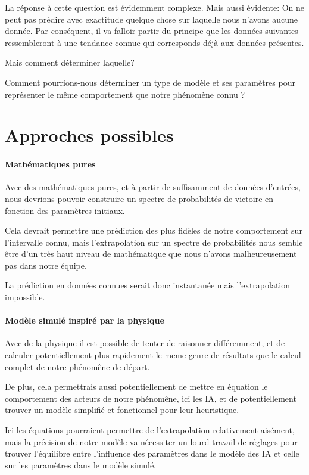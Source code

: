 		La réponse à cette question est évidemment complexe. Mais aussi évidente: On ne peut pas prédire avec exactitude quelque chose sur laquelle nous n'avons aucune donnée. 
		Par conséquent, il va falloir partir du principe que les données suivantes ressembleront à une tendance connue qui corresponds déjà aux données présentes.
		
		Mais comment déterminer laquelle?
	
		\begin{problem}
			Comment pourrions-nous déterminer un type de modèle et ses paramètres pour représenter le même comportement que notre phénomène connu ?
		\end{problem}
	
	\section{Approches possibles}
	
		\paragraph{Mathématiques pures}
		Avec des mathématiques pures, et à partir de suffisamment de données d'entrées, nous devrions pouvoir construire un spectre de probabilités de victoire en fonction des paramètres initiaux.
		
		Cela devrait permettre une prédiction des plus fidèles de notre comportement sur l'intervalle connu, mais l'extrapolation sur un spectre de probabilités nous semble être d'un très haut niveau de mathématique que nous n'avons malheureusement pas dans notre équipe.
		
		La prédiction en données connues serait donc instantanée mais l'extrapolation impossible.
		
		\paragraph{Modèle simulé inspiré par la physique}
		Avec de la physique il est possible de tenter de raisonner différemment, et de calculer potentiellement plus rapidement le meme genre de résultats que le calcul complet de notre phénomêne de départ.
		
		De plus, cela permettrais aussi potentiellement de mettre en équation le comportement des acteurs de notre phénomêne, ici les IA, et de potentiellement trouver un modèle simplifié et fonctionnel pour leur heuristique.
		
		Ici les équations pourraient permettre de l'extrapolation relativement aisément, mais la précision de notre modèle va nécessiter un lourd travail de réglages pour trouver l'équilibre entre l'influence des paramètres dans le modèle des IA et celle sur les paramètres dans le modèle simulé. 
		
